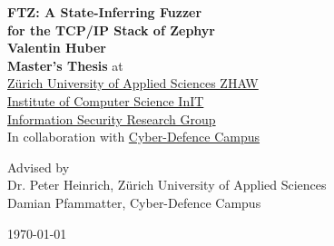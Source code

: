 \documentclass[twocolumn]{article}
\newcommand{\proj}{FTZ\xspace}
\begin{document}
\begin{titlepage}
  \large

  \begin{center}
    {\Huge\bfseries \proj : A State-Inferring Fuzzer\\[10pt]for the TCP/IP Stack of Zephyr}\\
    {\Large\bfseries Valentin Huber}\\
    {{\bfseries Master's Thesis} at}\\[1ex]
    \href{https://www.zhaw.ch/en/engineering/institutes-centres/init/information-security}{
      Zürich University of Applied Sciences ZHAW\\
      Institute of Computer Science InIT\\
      Information Security Research Group
    }\\[2ex]
    In collaboration with \href{https://www.cydcampus.admin.ch/}{Cyber-Defence Campus}\\

    Advised by\\
    Dr. Peter Heinrich, Zürich University of Applied Sciences\\
    Damian Pfammatter, Cyber-Defence Campus\\


    \today

  \end{center}
\end{titlepage}
\end{document}
